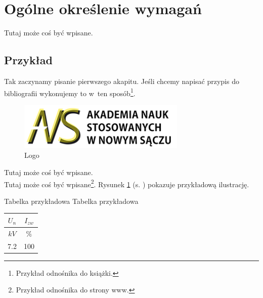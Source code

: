 	\newpage
\section{Ogólne określenie wymagań}		%













\hspace{0.60cm}Tutaj może coś być wpisane. 

\subsection{Przykład}  %

\hspace{0.60cm}Tak zaczynamy pisanie pierwszego akapitu. Jeśli chcemy napisać przypis do bibliografii wykonujemy to w~ten sposób\footnote{Przykład odnośnika do książki\cite{legierski}.}.

	\begin{figure}[!htb]
	\begin{center}
		\includegraphics[width=8cm]{rys/ans.png}
		\caption{Logo}
		\label{rys:rysunek001}
	\end{center}
\end{figure}

Tutaj może coś być wpisane. \\Tutaj może coś być wpisane\footnote{Przykład odnośnika do strony www\cite{www1}.}. 
Rysunek \ref{rys:rysunek001} (s. \pageref{rys:rysunek001}) pokazuje przykładową ilustrację.

\begin{tabela}
	{Tabelka przykładowa}	%
	{Tabelka przykładowa}	%
	{
		\begin{tabular}{|c|c|} \hline
			$U_n$ & $I_{zw}$ \\ \hline
			$kV$  & $\%$      \\ \hline
			7.2 & 100 \\ \hline
		\end{tabular}
	}
	\label{tab:tablica001}
\end{tabela}

